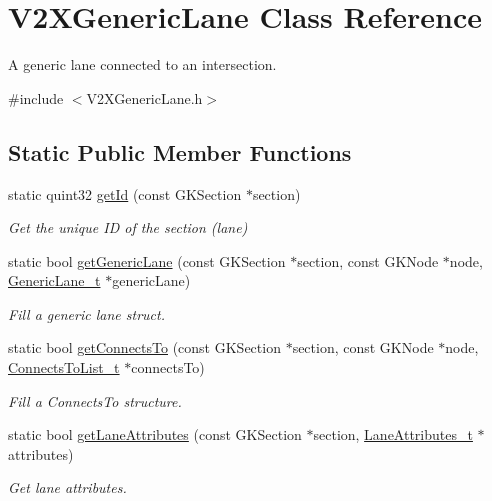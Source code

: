 \hypertarget{classV2XGenericLane}{}\section{V2\+X\+Generic\+Lane Class Reference}
\label{classV2XGenericLane}


A generic lane connected to an intersection.  




{\ttfamily \#include $<$V2\+X\+Generic\+Lane.\+h$>$}

\subsection*{Static Public Member Functions}
\begin{DoxyCompactItemize}
\item 
static quint32 \hyperlink{classV2XGenericLane_a9cc28d187662fa9159528caf998cd6d1}{get\+Id} (const G\+K\+Section $\ast$section)
\begin{DoxyCompactList}\small\item\em Get the unique ID of the section (lane) \end{DoxyCompactList}\item 
static bool \hyperlink{classV2XGenericLane_aa08c46fe2c03960eab2e17b765e8bd2f}{get\+Generic\+Lane} (const G\+K\+Section $\ast$section, const G\+K\+Node $\ast$node, \hyperlink{structGenericLane}{Generic\+Lane\+\_\+t} $\ast$generic\+Lane)
\begin{DoxyCompactList}\small\item\em Fill a generic lane struct. \end{DoxyCompactList}\item 
static bool \hyperlink{classV2XGenericLane_a6f2720dd290d768d91ff198fd2cbc9cf}{get\+Connects\+To} (const G\+K\+Section $\ast$section, const G\+K\+Node $\ast$node, \hyperlink{structConnectsToList}{Connects\+To\+List\+\_\+t} $\ast$connects\+To)
\begin{DoxyCompactList}\small\item\em Fill a Connects\+To structure. \end{DoxyCompactList}\item 
static bool \hyperlink{classV2XGenericLane_a4947a90e58287d48497bd13385d30248}{get\+Lane\+Attributes} (const G\+K\+Section $\ast$section, \hyperlink{structLaneAttributes}{Lane\+Attributes\+\_\+t} $\ast$attributes)
\begin{DoxyCompactList}\small\item\em Get lane attributes. \end{DoxyCompactList}\item 

\end{DoxyCompactItemize}
